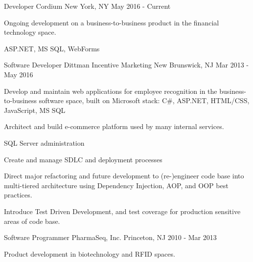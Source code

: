 \documentclass[11pt, letterpaper]{awesome-cv}
\begin{document}


\begin{cventries}
 \cventry
   {Developer}
   {Cordium}
   {New York, NY}
   {May 2016 - Current}
   {
     \begin {cvitems}
       \item {Ongoing development on a business-to-business product in the financial technology space.}
       \item {ASP.NET, MS SQL, WebForms}
     \end {cvitems}
   }
  \vspace{1mm}
  \cventry
    {Software Developer} %
    {Dittman Incentive Marketing} %
    {New Brunswick, NJ} %
    {Mar 2013 - May 2016} 
    {
      \begin{cvitems} 
        \item {Develop and maintain web applications for employee recognition in the business-to-business software space, built on Microsoft stack: C\#, ASP.NET, HTML/CSS, JavaScript, MS SQL}
        \item {Architect and build e-commerce platform used by many internal services.}
        \item {SQL Server administration}
        \item {Create and manage SDLC and deployment processes}
        \item {Direct major refactoring and future development to (re-)engineer code base into multi-tiered architecture using Dependency Injection, AOP, and OOP best practices.}
	\item {Introduce Test Driven Development, and test coverage for production sensitive areas of code base.}
      \end{cvitems}
    }
  \vspace{1mm}
  \cventry
    {Software Programmer} %
    {PharmaSeq, Inc.} %
    {Princeton, NJ} %
    {2010 - Mar 2013} %
    {
      \begin{cvitems} 
        \item {Product development in biotechnology and RFID spaces.}

\end{cvitems}}
\end{cventries}
\end{document}
